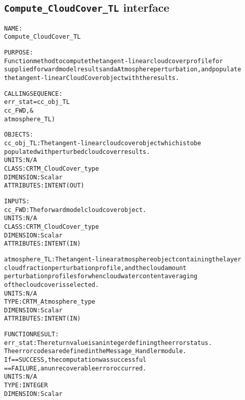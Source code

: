 \subsection{\texttt{Compute\_CloudCover\_TL} interface}
  \label{sec:Compute_CloudCover_TL_interface}
  \begin{alltt}
 
  NAME:
    Compute_CloudCover_TL
 
  PURPOSE:
    Function method to compute the tangent-linear cloud cover profile for
    supplied forward model results and a Atmosphere perturbation, and populate
    the tangent-linear CloudCover object with the results.
 
  CALLING SEQUENCE:
    err_stat = cc_obj_TL%Compute_CloudCover_TL( &
                 cc_FWD       , &
                 atmosphere_TL  )
 
  OBJECTS:
    cc_obj_TL:      The tangent-linear cloud cover object which is to be
                    populated with perturbed cloud cover results.
                    UNITS:      N/A
                    CLASS:      CRTM_CloudCover_type
                    DIMENSION:  Scalar
                    ATTRIBUTES: INTENT(OUT)
 
  INPUTS:
    cc_FWD:         The forward model cloud cover object.
                    UNITS:      N/A
                    CLASS:      CRTM_CloudCover_type
                    DIMENSION:  Scalar
                    ATTRIBUTES: INTENT(IN)
 
    atmosphere_TL:  The tangent-linear atmosphere object containing the layer
                    cloud fraction perturbation profile, and the cloud amount
                    perturbation profiles for when cloud water content averaging
                    of the cloud cover is selected.
                    UNITS:      N/A
                    TYPE:       CRTM_Atmosphere_type
                    DIMENSION:  Scalar
                    ATTRIBUTES: INTENT(IN)
 
  FUNCTION RESULT:
    err_stat:       The return value is an integer defining the error status.
                    The error codes are defined in the Message_Handler module.
                      If == SUCCESS, the computation was successful
                         == FAILURE, an unrecoverable error occurred.
                    UNITS:      N/A
                    TYPE:       INTEGER
                    DIMENSION:  Scalar
 
  \end{alltt}
